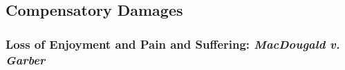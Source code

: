 % 
% 
% 
% 
% 
% 
\subsection{Compensatory Damages}
 
\subsubsection{Loss of Enjoyment and Pain and Suffering: \emph{MacDougald v.  
Garber}}

